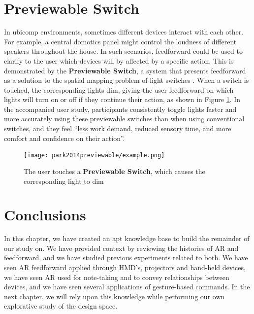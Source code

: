\section{Previewable Switch} \label{sec:relat:previewable_switch}
In ubicomp environments, sometimes different devices interact with each other. For example, a central domotics panel might control the loudness of different speakers throughout the house. In such scenarios, feedforward could be used to clarify to the user which devices will by affected by a specific action. This is demonstrated by the \textbf{Previewable Switch}, a system that presents feedforward as a solution to the spatial mapping problem of light switches \cite{park2014previewable}. When a switch is touched, the corresponding lights dim, giving the user feedforward on which lights will turn on or off if they continue their action, as shown in Figure \ref{fig:park2014previewable_demo}. In the accompanied user study, participants consistently toggle lights faster and more accurately using these previewable switches than when using conventional switches, and they feel ``less work demand, reduced sensory time, and more comfort and confidence on their action''.

\begin{figure}
    \centering
    \texttt{[image: park2014previewable/example.png]}
    \caption{The user touches a \textbf{Previewable Switch}, which causes the corresponding light to dim \cite{park2014previewable}}
    \label{fig:park2014previewable_demo}
\end{figure}

\section{Conclusions} \label{sec:relat:concl}
In this chapter, we have created an apt knowledge base to build the remainder of our study on. We have provided context by reviewing the histories of AR and feedforward, and we have studied previous experiments related to both. We have seen AR feedforward applied through HMD's, projectors and hand-held devices, we have seen AR used for note-taking and to convey relationships between devices, and we have seen several applications of gesture-based commands. In the next chapter, we will rely upon this knowledge while performing our own explorative study of the design space.


